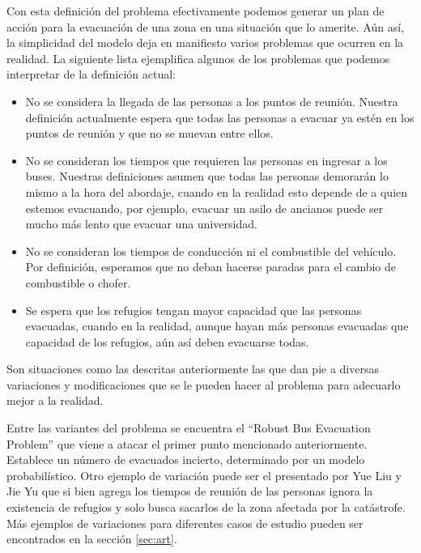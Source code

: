 \documentclass[letter, 10pt]{article}
\begin{document}
    Con esta definición del problema efectivamente podemos generar un plan de
    acción para la evacuación de una zona en una situación que lo amerite. Aún
    así, la simplicidad del modelo deja en manifiesto varios problemas que
    ocurren en la realidad. La siguiente lista ejemplifica algunos de los
    problemas que podemos interpretar de la definición actual:
    \begin{itemize}
        \item 
            No se considera la llegada de las personas a los puntos de
            reunión. Nuestra definición actualmente espera que todas las
            personas a evacuar ya estén en los puntos de reunión y que no se
            muevan entre ellos.
        \item
            No se consideran los tiempos que requieren las personas en ingresar
            a los buses. Nuestras definiciones asumen que todas las personas
            demorarán lo mismo a la hora del abordaje, cuando en la realidad
            esto depende de a quien estemos evacuando, por ejemplo, evacuar un
            asilo de ancianos puede ser mucho más lento que evacuar una
            universidad.
        \item
            No se consideran los tiempos de conducción ni el combustible del
            vehículo. Por definición, esperamos que no deban hacerse paradas
            para el cambio de combustible o chofer.
        \item
            Se espera que los refugios tengan mayor capacidad que las personas
            evacuadas, cuando en la realidad, aunque hayan más personas
            evacuadas que capacidad de los refugios, aún así deben evacuarse
            todas.
    \end{itemize}

    Son situaciones como las descritas anteriormente las que dan pie a diversas
    variaciones y modificaciones que se le pueden hacer al problema para
    adecuarlo mejor a la realidad.

    Entre las variantes del problema se encuentra el ``Robust Bus Evacuation
    Problem''\cite{goerigk2012robust} que viene a atacar el primer punto
    mencionado anteriormente. Establece un número de evacuados incierto,
    determinado por un modelo probabilístico.
    Otro ejemplo de variación puede ser el presentado por Yue Liu y Jie
    Yu\cite{liu2011emergency} que si bien agrega los tiempos de reunión de las
    personas ignora la existencia de refugios y solo busca sacarlos de la zona
    afectada por la catástrofe.
    Más ejemplos de variaciones para diferentes casos de estudio pueden ser
    encontrados en la sección \ref{sec:art}.
    
\end{document}
